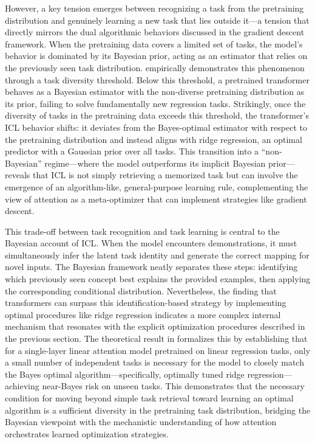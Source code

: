 \documentclass[11pt]{article}
\begin{document}
However, a key tension emerges between recognizing a task from the pretraining distribution and genuinely learning a new task that lies outside it---a tension that directly mirrors the dual algorithmic behaviors discussed in the gradient descent framework. When the pretraining data covers a limited set of tasks, the model's behavior is dominated by its Bayesian prior, acting as an estimator that relies on the previously seen task distribution. \cite{ref48} empirically demonstrates this phenomenon through a task diversity threshold. Below this threshold, a pretrained transformer behaves as a Bayesian estimator with the non-diverse pretraining distribution as its prior, failing to solve fundamentally new regression tasks. Strikingly, once the diversity of tasks in the pretraining data exceeds this threshold, the transformer's ICL behavior shifts: it deviates from the Bayes-optimal estimator with respect to the pretraining distribution and instead aligns with ridge regression, an optimal predictor with a Gaussian prior over all tasks. This transition into a ``non-Bayesian'' regime---where the model outperforms its implicit Bayesian prior---reveals that ICL is not simply retrieving a memorized task but can involve the emergence of an algorithm-like, general-purpose learning rule, complementing the view of attention as a meta-optimizer that can implement strategies like gradient descent.

This trade-off between task recognition and task learning is central to the Bayesian account of ICL. When the model encounters demonstrations, it must simultaneously infer the latent task identity and generate the correct mapping for novel inputs. The Bayesian framework neatly separates these steps: identifying which previously seen concept best explains the provided examples, then applying the corresponding conditional distribution. Nevertheless, the finding that transformers can surpass this identification-based strategy by implementing optimal procedures like ridge regression indicates a more complex internal mechanism that resonates with the explicit optimization procedures described in the previous section. The theoretical result in \cite{ref49} formalizes this by establishing that for a single-layer linear attention model pretrained on linear regression tasks, only a small number of independent tasks is necessary for the model to closely match the Bayes optimal algorithm---specifically, optimally tuned ridge regression---achieving near-Bayes risk on unseen tasks. This demonstrates that the necessary condition for moving beyond simple task retrieval toward learning an optimal algorithm is a sufficient diversity in the pretraining task distribution, bridging the Bayesian viewpoint with the mechanistic understanding of how attention orchestrates learned optimization strategies.
\end{document}

